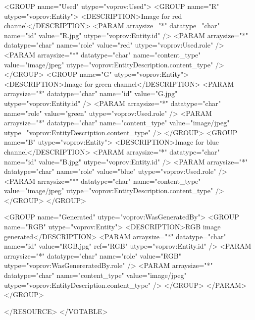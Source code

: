 \begin{verbnobox}[\scriptsize]
    <GROUP name="Used" utype="voprov:Used">
      <GROUP name="R" utype="voprov:Entity">
        <DESCRIPTION>Image for red channel</DESCRIPTION>
        <PARAM arraysize="*" datatype="char" name="id" value="R.jpg" utype="voprov:Entity.id" />
        <PARAM arraysize="*" datatype="char" name="role" value="red" utype="voprov:Used.role" />
        <PARAM arraysize="*" datatype="char" name="content_type" value="image/jpeg" utype="voprov:EntityDescription.content_type" />
      </GROUP>
      <GROUP name="G" utype="voprov:Entity">
        <DESCRIPTION>Image for green channel</DESCRIPTION>
        <PARAM arraysize="*" datatype="char" name="id" value="G.jpg" utype="voprov:Entity.id" />
        <PARAM arraysize="*" datatype="char" name="role" value="green" utype="voprov:Used.role" />
        <PARAM arraysize="*" datatype="char" name="content_type" value="image/jpeg" utype="voprov:EntityDescription.content_type" />
      </GROUP>
      <GROUP name="B" utype="voprov:Entity">
        <DESCRIPTION>Image for blue channel</DESCRIPTION>
        <PARAM arraysize="*" datatype="char" name="id" value="B.jpg" utype="voprov:Entity.id" />
        <PARAM arraysize="*" datatype="char" name="role" value="blue" utype="voprov:Used.role" />
        <PARAM arraysize="*" datatype="char" name="content_type" value="image/jpeg" utype="voprov:EntityDescription.content_type" />
      </GROUP>
    </GROUP>
    
    <GROUP name="Generated" utype="voprov:WasGeneratedBy">
      <GROUP name="RGB" utype="voprov:Entity">
        <DESCRIPTION>RGB image generated</DESCRIPTION>
        <PARAM arraysize="*" datatype="char" name="id" value="RGB.jpg" ref="RGB" utype="voprov:Entity.id" />
        <PARAM arraysize="*" datatype="char" name="role" value="RGB" utype="voprov:WasGenereratedBy.role" />
        <PARAM arraysize="*" datatype="char" name="content_type" value="image/jpeg" utype="voprov:EntityDescription.content_type" />
      </GROUP>
      </PARAM>
    </GROUP>
    
  </RESOURCE>
</VOTABLE>

\end{verbnobox}

